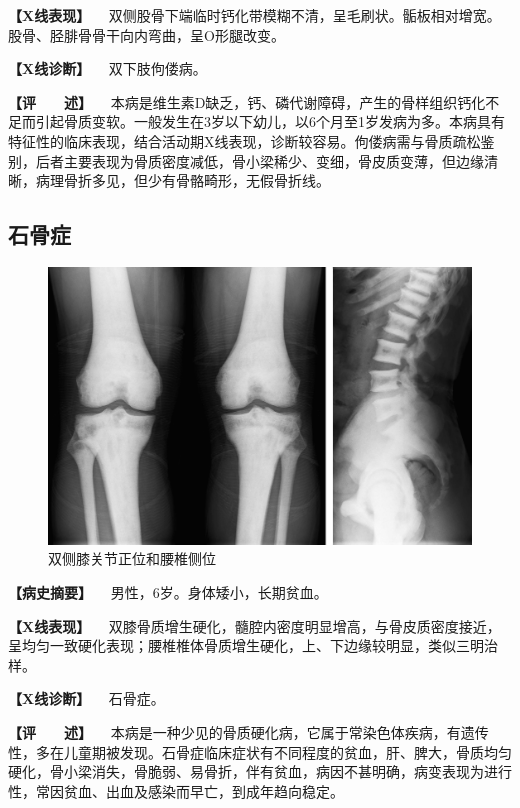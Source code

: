 \textbf{【X线表现】}
　双侧股骨下端临时钙化带模糊不清，呈毛刷状。骺板相对增宽。股骨、胫腓骨骨干向内弯曲，呈O形腿改变。

\textbf{【X线诊断】} 　双下肢佝偻病。

\textbf{【评　　述】}
　本病是维生素D缺乏，钙、磷代谢障碍，产生的骨样组织钙化不足而引起骨质变软。一般发生在3岁以下幼儿，以6个月至1岁发病为多。本病具有特征性的临床表现，结合活动期X线表现，诊断较容易。佝偻病需与骨质疏松鉴别，后者主要表现为骨质密度减低，骨小梁稀少、变细，骨皮质变薄，但边缘清晰，病理骨折多见，但少有骨骼畸形，无假骨折线。

\subsection{石骨症}

\begin{figure}[!htbp]
 \centering
 \includegraphics{./images/Image00123.jpg}
 \captionsetup{justification=centering}
 \caption{双侧膝关节正位和腰椎侧位}
 \label{fig2-8-9}
  \end{figure} 

\textbf{【病史摘要】} 　男性，6岁。身体矮小，长期贫血。

\textbf{【X线表现】}
　双膝骨质增生硬化，髓腔内密度明显增高，与骨皮质密度接近，呈均匀一致硬化表现；腰椎椎体骨质增生硬化，上、下边缘较明显，类似三明治样。

\textbf{【X线诊断】} 　石骨症。

\textbf{【评　　述】}
　本病是一种少见的骨质硬化病，它属于常染色体疾病，有遗传性，多在儿童期被发现。石骨症临床症状有不同程度的贫血，肝、脾大，骨质均匀硬化，骨小梁消失，骨脆弱、易骨折，伴有贫血，病因不甚明确，病变表现为进行性，常因贫血、出血及感染而早亡，到成年趋向稳定。

